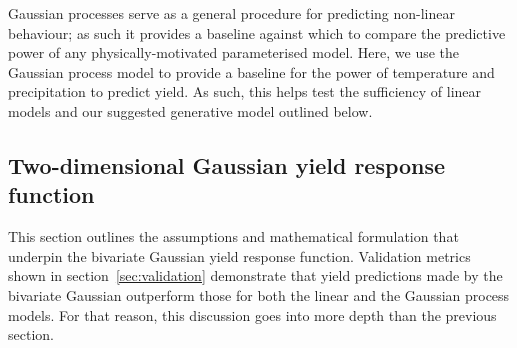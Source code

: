 \documentclass[12pt]{iopart}
\newcommand{\remove}[1]{}
\newcommand{\add}[1]{#1}
\begin{document}
Gaussian processes serve as a general procedure for predicting non-linear behaviour; as such it provides a baseline \remove{with}\add{against} which to compare the predictive power of any physically-motivated parameterised model. Here, we use the Gaussian process model to provide a baseline for the power of temperature and precipitation to predict yield. As such, this helps test the sufficiency of linear models and our suggested generative model outlined below.

\subsection{Two-dimensional Gaussian yield response function}
\label{sec:2d_descrip_appendix}

This section outlines the assumptions and mathematical formulation that underpin the bivariate Gaussian yield response function. Validation metrics shown in section~\ref{sec:validation} demonstrate that yield predictions made by the bivariate Gaussian outperform those for both the linear and the Gaussian process models. For that reason, this discussion goes into more depth than the previous section.
\end{document}
